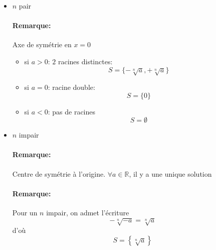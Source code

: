 \documentclass[
    11pt,
    a4paper,
    oneside,
    headinlcude, footinclude,
    twoside,
]{report}
\begin{document}
\begin{itemize}
    \item  $n$ pair
        \begin{center}
            \begin{minipage}{.5\linewidth}
                \resizebox{\textwidth}{!}{
                }
            \end{minipage}
            \begin{minipage}{.49\linewidth}
                \setlength{\parskip}{.3em}
                \paragraph{Remarque:}
                Axe de symétrie en $x = 0$
                \begin{itemize}
                    \item si $a > 0$: $2$ racines distinctes:
                        $$S = \{-\sqrt[n]{a}, +\sqrt[n]{a}\}$$
                    \item si $a = 0$: racine double:
                        $$S = \{0\}$$
                    \item si $a < 0$: pas de racines
                        $$S = \emptyset$$
                \end{itemize}
            \end{minipage}
        \end{center}
    \item $n$ impair
        \begin{center}
            \begin{minipage}{.5\linewidth}
                \resizebox{\textwidth}{!}{

                }
            \end{minipage}
            \begin{minipage}{.49\linewidth}
                \setlength{\parskip}{.3em}
                \paragraph{Remarque:}
                Centre de symétrie à l'origine.  $\forall a \in \mathbb{R}$,
                il y a une unique solution

                \paragraph{Remarque:}
                Pour un $n$ impair, on admet l'écriture $$-\sqrt[n]{-a} = \sqrt[n]{a}$$
                d'où $$S=\left\{\sqrt[n]{a}\right\}$$
            \end{minipage}
        \end{center}
\end{itemize}
\end{document}
